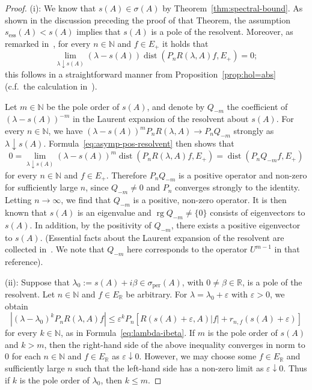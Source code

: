 \documentclass[a4paper, reqno]{amsart}
\numberwithin{equation}{section}
\theoremstyle{plain}
\theoremstyle{definition}
\theoremstyle{remark}
\DeclareMathOperator{\rg}{rg}
\DeclareMathOperator{\dist}{dist}
\newcommand{\NN}{\mathbb{N}}
\newcommand{\RR}{\mathbb{R}}
\begin{document}
\begin{proof}
	(i): We know that $s(A)\in\sigma(A)$ by Theorem~\ref{thm:spectral-bound}. As shown in the discussion preceding the proof of that Theorem, the assumption $s_{\mathrm{ess}}(A)<s(A)$ implies that $s(A)$ is a pole of the resolvent. Moreover, as remarked in~\cite[Corollary 6.2]{Ar21}, for every $n\in\NN$ and $f\in E_+$ it holds that
	\begin{equation}
	\label{eq:asymp-pos-resolvent}
		\lim_{\lambda\downarrow s(A)} (\lambda-s(A)) \dist(P_nR(\lambda,A)f, E_+) = 0;
	\end{equation}
	this follows in a straightforward manner from Proposition~\ref{prop:hol=abs} (c.f.~the calculation in~\cite[Corollary 7.3]{DGK1}).
	
	Let $m\in\NN$ be the pole order of $s(A)$, and denote by $Q_{-m}$ the coefficient of $(\lambda-s(A))^{-m}$ in the Laurent expansion of the resolvent about $s(A)$. For every $n\in\NN$, we have $(\lambda-s(A))^m P_n R(\lambda,A) \to P_n Q_{-m}$ strongly as $\lambda\downarrow s(A)$. Formula~\eqref{eq:asymp-pos-resolvent} then shows that
	\begin{equation*}
		0 = \lim_{\lambda\downarrow s(A)} (\lambda-s(A))^m \dist(P_nR(\lambda,A)f, E_+) = \dist(P_n Q_{-m}f, E_+)
	\end{equation*}
	for every $n\in\NN$ and $f\in E_+$. Therefore $P_n Q_{-m}$ is a positive operator and non-zero for sufficiently large $n$, since $Q_{-m}\ne 0$ and $P_n$ converges strongly to the identity. Letting $n\to\infty$, we find that $Q_{-m}$ is a positive, non-zero operator. It is then known that $s(A)$ is an eigenvalue and $\rg Q_{-m}\ne\{0\}$ consists of eigenvectors to $s(A)$. In addition, by the positivity of $Q_{-m}$, there exists a positive eigenvector to $s(A)$. (Essential facts about the Laurent expansion of the resolvent are collected in~\cite[Remark 2.1]{DGK1}. We note that $Q_{-m}$ here corresponds to the operator $U^{m-1}$ in that reference).
	
	(ii): Suppose that $\lambda_0:=s(A)+i\beta\in\sigma_{\mathrm{per}}(A)$, with $0\ne\beta\in\RR$, is a pole of the resolvent. Let $n\in\NN$ and $f\in E_\RR$ be arbitrary. For $\lambda=\lambda_0+\varepsilon$ with $\varepsilon>0$, we obtain
	\begin{equation*}
		|(\lambda-\lambda_0)^k P_n R(\lambda,A)f| \le \varepsilon^k P_n[R(s(A)+\varepsilon,A)|f|+r_{n,f}(s(A)+\varepsilon)]
	\end{equation*}
	for every $k\in\NN$, as in Formula~\eqref{eq:lambda-ibeta}. If $m$ is the pole order of $s(A)$ and $k>m$, then the right-hand side of the above inequality converges in norm to $0$ for each $n\in\NN$ and $f\in E_\RR$ as $\varepsilon\downarrow 0$. However, we may choose some $f\in E_\RR$ and sufficiently large $n$ such that the left-hand side has a non-zero limit as $\varepsilon\downarrow 0$. Thus if $k$ is the pole order of $\lambda_0$, then $k\le m$.
\end{proof}
\end{document}
